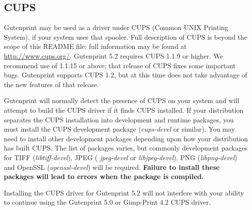 \documentclass{article}[letter]
\begin{document}
\subsection{CUPS}

Gutenprint may be used as a driver under CUPS (Common UNIX Printing
System), if your system uses that spooler. Full description of CUPS is
beyond the scope of this README file; full information may be found at
\url{http://www.cups.org/}. Gutenprint 5.2 requires
CUPS 1.1.9 or higher. We recommend use of 1.1.15 or above; that
release of CUPS fixes some important bugs. Gutenprint supports CUPS
1.2, but at this time does not take advantage of the new features of
that release.

Gutenprint will normally detect the presence of CUPS on your system
and will attempt to build the CUPS driver if it finds CUPS
installed. If your distribution separates the CUPS installation into
development and runtime packages, you must install the CUPS
development package ({\em cups-devel} or similar). You may need to
install other development packages depending upon how your
distribution has built CUPS. The list of packages varies, but commonly
development packages for TIFF ({\em libtiff-devel}), JPEG ({\em
  jpeg-devel} or {\em libjpeg-devel}), PNG ({\em libpng-devel}) and
OpenSSL ({\em openssl-devel}) will be required.  {\bf Failure to
  install these packages will lead to errors when the package is
  compiled.}

Installing the CUPS driver for Gutenprint 5.2 will not interfere with
your ability to continue using the Gutenprint 5.0 or Gimp-Print 4.2
CUPS driver.
\end{document}
